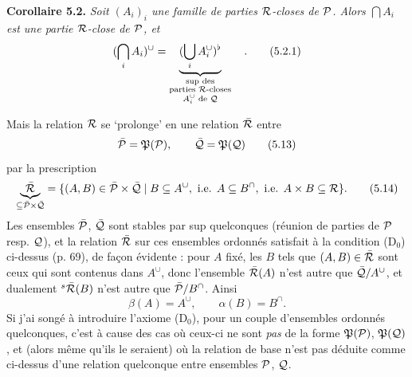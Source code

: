 \textbf{Corollaire 5.2.} \textit{Soit $(A_i)_i$ une famille de parties $\mathcal{R}$-closes de $\mathcal{P}$. Alors $\bigcap A_i$ est une partie $\mathcal{R}$-close de $\mathcal{P}$, et}
\[
(\bigcap_i A_i)^{\cup} = \underbrace{(\bigcup_i A_i^{\cup})^{\flat}}_{\substack{\text{sup des}\\ \text{parties } \cR\text{-closes}\\ A_i^{\cup} \text{ de } \cQ}} \quad .
\tag*{(5.2.1)}
\]

Mais la relation $\mathcal{R}$ se `prolonge' en une relation $\bar{\mathcal{R}}$ entre
\[
\bar{\cP} = \fP(\cP), \qquad \bar{\cQ} = \fP(\cQ)
\tag*{(5.13)}
\]
par la prescription
\[
\underbrace{\bar{\cR}}_{\subseteq \bar{\cP} \times \bar{\cQ}} = \{(A,B) \in \bar{\cP} \times \bar{\cQ} \mid B \subseteq A^{\cup},\ \text{i.e. } A \subseteq B^{\cap},\ \text{i.e. } A \times B \subseteq \cR\}.
\tag*{(5.14)}
\]
Les ensembles $\bar{\mathcal{P}}$, $\bar{\mathcal{Q}}$ sont stables par sup quelconques (réunion de parties de $\mathcal{P}$ resp. $\mathcal{Q}$), et la relation $\bar{\mathcal{R}}$ sur ces ensembles ordonnés satisfait à la condition (D$_0$)
ci-dessus (p. 69), de façon évidente : pour $A$ fixé, les $B$ tels que $(A,B) \in \bar{\mathcal{R}}$ sont ceux qui sont contenus dans $A^{\cup}$, donc l'ensemble $\bar{\mathcal{R}}(A)$ n'est autre que $\bar{\mathcal{Q}}/A^{\cup}$, et dualement ${}^{s}\bar{\mathcal{R}}(B)$ n'est autre que $\bar{\mathcal{P}}/B^{\cap}$. Ainsi
\[
\beta(A) = A^{\cup}, \qquad \alpha(B) = B^{\cap}.
\tag*{(5.14)} %
\]
Si j'ai songé à introduire l'axiome (D$_0$), pour un couple d'ensembles ordonnés quelconques, c'est à cause des cas où ceux-ci ne sont \textit{pas} de la forme $\mathfrak{P}(\mathcal{P})$, $\mathfrak{P}(\mathcal{Q})$, et (alors même qu'ils le seraient) où la relation de base n'est pas déduite comme ci-dessus d'une relation quelconque entre ensembles $\mathcal{P}$, $\mathcal{Q}$.

